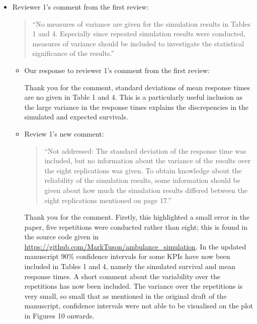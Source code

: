 \documentclass{article}
\begin{document}
\begin{itemize}
    \item Reviewer 1's comment from the first review:

    \begin{quote}
    ``No measures of variance are given for the simulation results in Tables 1 and 4. Especially since repeated simulation results were conducted, measures of variance should be included to investigate the statistical significance of the results.''
    \end{quote}

    \begin{itemize}
        \item Our response to reviewer 1's comment from the first review:

        Thank you for the comment, standard deviations of mean response times are no
        given in Table 1 and 4. This is a particularly useful inclusion as the
        large variance in the response times explains the discrepencies in the
        simulated and expected survivals.

        \item Review 1's new comment:

        \begin{quote}
        ``Not addressed: The standard deviation of the response time was included, but no information about the variance of the results over the eight
        replications was given. To obtain knowledge about the reliability of the
        simulation results, some information should be given about how much the
        simulation results differed between the eight replications mentioned on
        page 17.''
        \end{quote}

        Thank you for the comment. Firstly, this highlighted a small error in the paper, five repetitions were conducted rather than eight; this is found in the source code given in \url{https://github.com/MarkTuson/ambulance_simulation}. In the updated manuscript 90\% confidence intervals for some KPIs have now been included in Tables 1 and 4, namely the simulated survival and mean response times. A short comment about the variability over the repetitions has now been included. The variance over the repetitions is very small, so small that as mentioned in the original draft of the manuscript, confidence intervals were not able to be visualised on the plot in Figures 10 onwards.
    \end{itemize}


\end{itemize}
\end{document}
